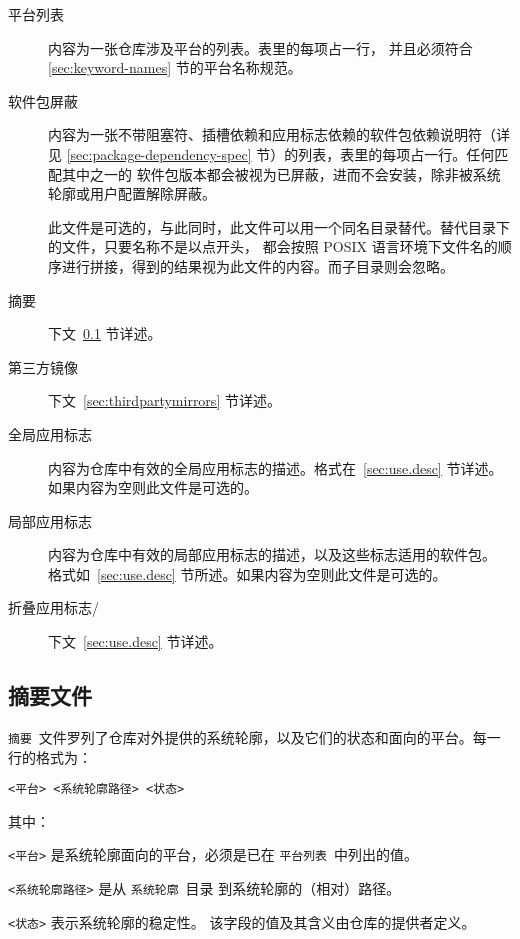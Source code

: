 \begin{description}
\item[平台列表] 内容为一张仓库涉及平台的列表。表里的每项占一行，
    并且必须符合 \ref{sec:keyword-names} 节的平台名称规范。
\item[软件包屏蔽]
    内容为一张不带阻塞符、插槽依赖和应用标志依赖的软件包依赖说明符（详见
    \ref{sec:package-dependency-spec} 节）的列表，表里的每项占一行。任何匹配其中之一的
    软件包版本都会被视为已屏蔽，进而不会安装，除非被系统轮廓或用户配置解除屏蔽。

    此文件是可选的，与此同时，此文件可以用一个同名目录替代。替代目录下的文件，只要名称不是以点开头，
    都会按照 POSIX 语言环境下文件名的顺序进行拼接，得到的结果视为此文件的内容。而子目录则会忽略。
\item[摘要] 下文~\ref{sec:profiles.desc} 节详述。
\item[第三方镜像] 下文~\ref{sec:thirdpartymirrors} 节详述。
\item[全局应用标志] 内容为仓库中有效的全局应用标志的描述。格式在~\ref{sec:use.desc} 节详述。
    如果内容为空则此文件是可选的。
\item[局部应用标志] 内容为仓库中有效的局部应用标志的描述，以及这些标志适用的软件包。
    格式如~\ref{sec:use.desc} 节所述。如果内容为空则此文件是可选的。
\item[折叠应用标志/] 下文~\ref{sec:use.desc} 节详述。
\end{description}

\subsection{摘要文件}
\label{sec:profiles.desc}
\texttt{摘要}\ 文件罗列了仓库对外提供的系统轮廓，以及它们的状态和面向的平台。每一行的格式为：

\begin{verbatim}
<平台> <系统轮廓路径> <状态>
\end{verbatim}

其中：
\begin{compactitem}
\item \texttt{<\hspace{0em}平台\hspace{0em}>} 是系统轮廓面向的平台，必须是已在
    \texttt{平台列表}\ 中列出的值。
\item \texttt{<\hspace{0em}系统轮廓路径\hspace{0em}>} 是从 \texttt{系统轮廓}\ 目录
    到系统轮廓的（相对）路径。
\item \texttt{<\hspace{0em}状态\hspace{0em}>} 表示系统轮廓的稳定性。
    该字段的值及其含义由仓库的提供者定义。
\end{compactitem}

